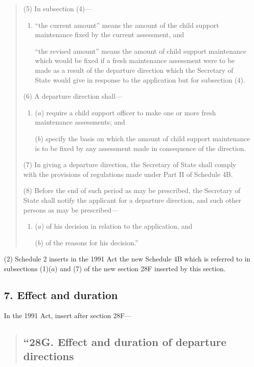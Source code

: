 \documentclass[a4paper]{article}
\begin{document}
{\begin{quotation}
(5) In subsection (4)—
\begin{enumerate}\item[]
    “the current amount” means the amount of the child support maintenance fixed by the current assessment, and

    “the revised amount” means the amount of child support maintenance which would be fixed if a fresh maintenance assessment were to be made as a result of the departure direction which the Secretary of State would give in response to the application but for subsection (4). 
\end{enumerate}

(6) A departure direction shall—
\begin{enumerate}\item[]
($a$) require a child support officer to make one or more fresh maintenance assessments; and

($b$) specify the basis on which the amount of child support maintenance is to be fixed by any assessment made in consequence of the direction.
\end{enumerate}

(7) In giving a departure direction, the Secretary of State shall comply with the provisions of regulations made under Part II of Schedule 4B.

(8) Before the end of such period as may be prescribed, the Secretary of State shall notify the applicant for a departure direction, and such other persons as may be prescribed—
\begin{enumerate}\item[]
($a$) of his decision in relation to the application, and

($b$) of the reasons for his decision.”
\end{enumerate}
\end{quotation}

(2) Schedule 2 inserts in the 1991 Act the new Schedule 4B which is referred to in subsections (1)($a$) and (7) of the new section 28F inserted by this section.

\subsection{7. Effect and duration}

In the 1991 Act, insert after section 28F—
\begin{quotation}
\subsection*{“28G. Effect and duration of departure directions}


\end{quotation}}
\end{document}
